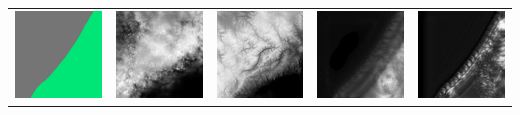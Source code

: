 \documentclass[twocolumn]{article}
\begin{document}
\begin{table}[t]
\begin{tabular}{c|c|c|c|c}
 				\includegraphics[width=0.25\columnwidth]{80.png} & \includegraphics[width=0.25\columnwidth]{81.png} & \includegraphics[width=0.25\columnwidth]{82.png} & \includegraphics[width=0.25\columnwidth]{83.png} & \includegraphics[width=0.25\columnwidth]{84.png} \\

\end{tabular}
\end{table}
\end{document}
